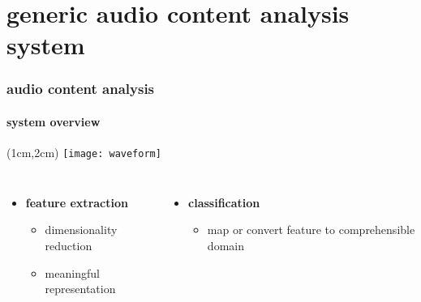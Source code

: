     \section[ACA]{generic audio content analysis system}
        \begin{frame}\frametitle{audio content analysis}\framesubtitle{system overview}
            \begin{textblock*}{100mm}(1cm,2cm)
                \texttt{[image: waveform]}
            \end{textblock*}
            \begin{figure}
                \centering
            \end{figure}
            
            \begin{columns}
                    \begin{itemize}
                        \item<2->[]	\textbf{feature extraction}
                                \begin{itemize}
                                    \item 	dimensionality reduction
                                    \item	meaningful representation
                                \end{itemize}
                    \end{itemize}
                    \begin{itemize}
                        \item<3->[]	\textbf{classification}
                                \begin{itemize}
                                    \item	map or convert feature to comprehensible domain
                                \end{itemize}
                    \end{itemize}
            \end{columns}
        \end{frame}

